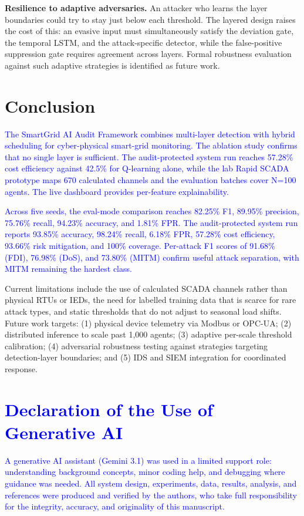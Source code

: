\documentclass[conference,a4paper]{IEEEtran}
\begin{document}
\textbf{Resilience to adaptive adversaries.} An attacker who learns the layer boundaries could try to stay just below each threshold. The layered design raises the cost of this: an evasive input must simultaneously satisfy the deviation gate, the temporal LSTM, and the attack-specific detector, while the false-positive suppression gate requires agreement across layers. Formal robustness evaluation against such adaptive strategies is identified as future work.

\section{Conclusion}

\textcolor{blue}{The SmartGrid AI Audit Framework combines multi-layer detection with hybrid scheduling for cyber-physical smart-grid monitoring. The ablation study confirms that no single layer is sufficient. The audit-protected system run reaches 57.28\% cost efficiency against 42.5\% for Q-learning alone, while the lab Rapid SCADA prototype maps 670 calculated channels and the evaluation batches cover N=100 agents. The live dashboard provides per-feature explainability.}

\textcolor{blue}{Across five seeds, the eval-mode comparison reaches 82.25\% F1, 89.95\% precision, 75.76\% recall, 94.23\% accuracy, and 1.81\% FPR. The audit-protected system run reports 93.85\% accuracy, 98.24\% recall, 6.18\% FPR, 57.28\% cost efficiency, 93.66\% risk mitigation, and 100\% coverage. Per-attack F1 scores of 91.68\% (FDI), 76.98\% (DoS), and 73.80\% (MITM) confirm useful attack separation, with MITM remaining the hardest class.}

Current limitations include the use of calculated SCADA channels rather than physical RTUs or IEDs, the need for labelled training data that is scarce for rare attack types, and static thresholds that do not adjust to seasonal load shifts. Future work targets: (1) physical device telemetry via Modbus or OPC-UA; (2) distributed inference to scale past 1,000 agents; (3) adaptive per-scale threshold calibration; (4) adversarial robustness testing against strategies targeting detection-layer boundaries; and (5) IDS and SIEM integration for coordinated response.

\section*{\textcolor{blue}{Declaration of the Use of Generative AI}}
\textcolor{blue}{A generative AI assistant (Gemini 3.1) was used in a limited support role: understanding background concepts, minor coding help, and debugging where guidance was needed. All system design, experiments, data, results, analysis, and references were produced and verified by the authors, who take full responsibility for the integrity, accuracy, and originality of this manuscript.}
\end{document}
